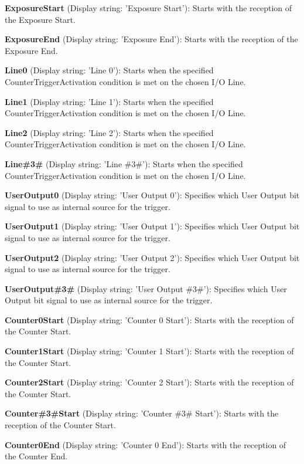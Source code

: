 \begin{DoxyItemize}
\item {\bfseries Exposure\+Start} (Display string\+: 'Exposure Start')\+: Starts with the reception of the Exposure Start.
\item {\bfseries Exposure\+End} (Display string\+: 'Exposure End')\+: Starts with the reception of the Exposure End.
\item {\bfseries Line0} (Display string\+: 'Line 0')\+: Starts when the specified Counter\+Trigger\+Activation condition is met on the chosen I/\+O Line.
\item {\bfseries Line1} (Display string\+: 'Line 1')\+: Starts when the specified Counter\+Trigger\+Activation condition is met on the chosen I/\+O Line.
\item {\bfseries Line2} (Display string\+: 'Line 2')\+: Starts when the specified Counter\+Trigger\+Activation condition is met on the chosen I/\+O Line.
\item {\bfseries Line\#3\#} (Display string\+: 'Line \#3\#')\+: Starts when the specified Counter\+Trigger\+Activation condition is met on the chosen I/\+O Line.
\item {\bfseries User\+Output0} (Display string\+: 'User Output 0')\+: Specifies which User Output bit signal to use as internal source for the trigger.
\item {\bfseries User\+Output1} (Display string\+: 'User Output 1')\+: Specifies which User Output bit signal to use as internal source for the trigger.
\item {\bfseries User\+Output2} (Display string\+: 'User Output 2')\+: Specifies which User Output bit signal to use as internal source for the trigger.
\item {\bfseries User\+Output\#3\#} (Display string\+: 'User Output \#3\#')\+: Specifies which User Output bit signal to use as internal source for the trigger.
\item {\bfseries Counter0\+Start} (Display string\+: 'Counter 0 Start')\+: Starts with the reception of the Counter Start.
\item {\bfseries Counter1\+Start} (Display string\+: 'Counter 1 Start')\+: Starts with the reception of the Counter Start.
\item {\bfseries Counter2\+Start} (Display string\+: 'Counter 2 Start')\+: Starts with the reception of the Counter Start.
\item {\bfseries Counter\#3\#Start} (Display string\+: 'Counter \#3\# Start')\+: Starts with the reception of the Counter Start.
\item {\bfseries Counter0\+End} (Display string\+: 'Counter 0 End')\+: Starts with the reception of the Counter End.

\end{DoxyItemize}
